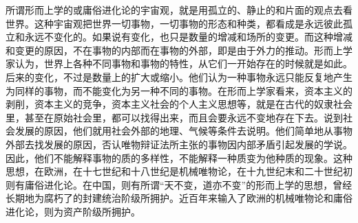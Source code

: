 所谓形而上学的或庸俗进化论的宇宙观，就是用孤立的、静止的和片面的观点去看世界。这种宇宙观把世界一切事物，一切事物的形态和种类，都看成是永远彼此孤立和永远不变化的。如果说有变化，也只是数量的增减和场所的变更。而这种增减和变更的原因，不在事物的内部而在事物的外部，即是由于外力的推动。形而上学家认为，世界上各种不同事物和事物的特性，从它们一开始存在的时候就是如此。后来的变化，不过是数量上的扩大或缩小。他们认为一种事物永远只能反复地产生为同样的事物，而不能变化为另一种不同的事物。在形而上学家看来，资本主义的剥削，资本主义的竞争，资本主义社会的个人主义思想等，就是在古代的奴隶社会里，甚至在原始社会里，都可以找得出来，而且会要永远不变地存在下去。说到社会发展的原因，他们就用社会外部的地理、气候等条件去说明。他们简单地从事物外部去找发展的原因，否认唯物辩证法所主张的事物因内部矛盾引起发展的学说。因此，他们不能解释事物的质的多样性，不能解释一种质变为他种质的现象。这种思想，在欧洲，在十七世纪和十八世纪是机械唯物论，在十九世纪末和二十世纪初则有庸俗进化论。在中国，则有所谓“天不变，道亦不变”的形而上学的思想，曾经长期地为腐朽了的封建统治阶级所拥护。近百年来输入了欧洲的机械唯物论和庸俗进化论，则为资产阶级所拥护。

